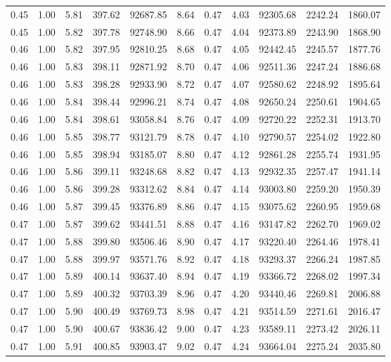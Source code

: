 \begin{table}[!ht]
\begin{tabular}{rrrrrrrrrrr}
0.45 & 1.00 & 5.81 & 397.62 & 92687.85 & 8.64 & 0.47 & 4.03 & 92305.68 & 2242.24 & 1860.07 \\
0.45 & 1.00 & 5.82 & 397.78 & 92748.90 & 8.66 & 0.47 & 4.04 & 92373.89 & 2243.90 & 1868.90 \\
0.46 & 1.00 & 5.82 & 397.95 & 92810.25 & 8.68 & 0.47 & 4.05 & 92442.45 & 2245.57 & 1877.76 \\
0.46 & 1.00 & 5.83 & 398.11 & 92871.92 & 8.70 & 0.47 & 4.06 & 92511.36 & 2247.24 & 1886.68 \\
0.46 & 1.00 & 5.83 & 398.28 & 92933.90 & 8.72 & 0.47 & 4.07 & 92580.62 & 2248.92 & 1895.64 \\
0.46 & 1.00 & 5.84 & 398.44 & 92996.21 & 8.74 & 0.47 & 4.08 & 92650.24 & 2250.61 & 1904.65 \\
0.46 & 1.00 & 5.84 & 398.61 & 93058.84 & 8.76 & 0.47 & 4.09 & 92720.22 & 2252.31 & 1913.70 \\
0.46 & 1.00 & 5.85 & 398.77 & 93121.79 & 8.78 & 0.47 & 4.10 & 92790.57 & 2254.02 & 1922.80 \\
0.46 & 1.00 & 5.85 & 398.94 & 93185.07 & 8.80 & 0.47 & 4.12 & 92861.28 & 2255.74 & 1931.95 \\
0.46 & 1.00 & 5.86 & 399.11 & 93248.68 & 8.82 & 0.47 & 4.13 & 92932.35 & 2257.47 & 1941.14 \\
0.46 & 1.00 & 5.86 & 399.28 & 93312.62 & 8.84 & 0.47 & 4.14 & 93003.80 & 2259.20 & 1950.39 \\
0.46 & 1.00 & 5.87 & 399.45 & 93376.89 & 8.86 & 0.47 & 4.15 & 93075.62 & 2260.95 & 1959.68 \\
0.47 & 1.00 & 5.87 & 399.62 & 93441.51 & 8.88 & 0.47 & 4.16 & 93147.82 & 2262.70 & 1969.02 \\
0.47 & 1.00 & 5.88 & 399.80 & 93506.46 & 8.90 & 0.47 & 4.17 & 93220.40 & 2264.46 & 1978.41 \\
0.47 & 1.00 & 5.88 & 399.97 & 93571.76 & 8.92 & 0.47 & 4.18 & 93293.37 & 2266.24 & 1987.85 \\
0.47 & 1.00 & 5.89 & 400.14 & 93637.40 & 8.94 & 0.47 & 4.19 & 93366.72 & 2268.02 & 1997.34 \\
0.47 & 1.00 & 5.89 & 400.32 & 93703.39 & 8.96 & 0.47 & 4.20 & 93440.46 & 2269.81 & 2006.88 \\
0.47 & 1.00 & 5.90 & 400.49 & 93769.73 & 8.98 & 0.47 & 4.21 & 93514.59 & 2271.61 & 2016.47 \\
0.47 & 1.00 & 5.90 & 400.67 & 93836.42 & 9.00 & 0.47 & 4.23 & 93589.11 & 2273.42 & 2026.11 \\
0.47 & 1.00 & 5.91 & 400.85 & 93903.47 & 9.02 & 0.47 & 4.24 & 93664.04 & 2275.24 & 2035.80 \\

\end{tabular}
\end{table}
